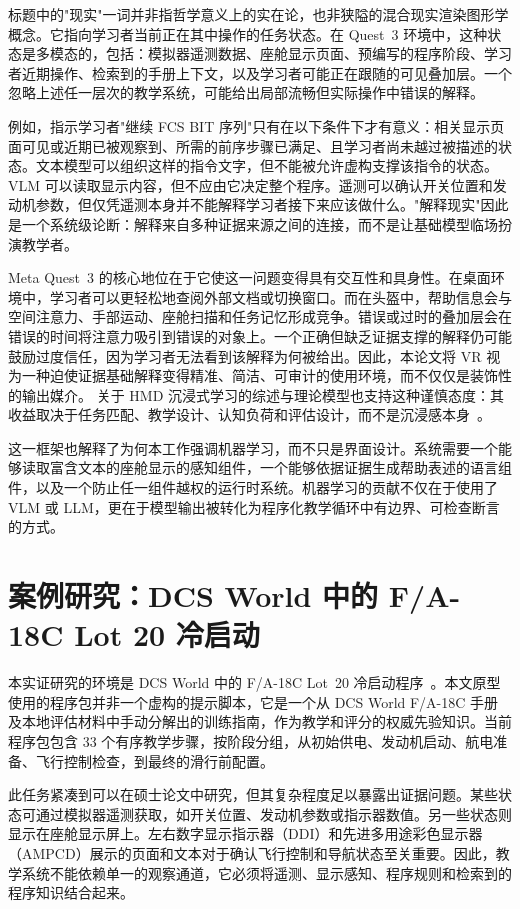 标题中的"现实"一词并非指哲学意义上的实在论，也非狭隘的混合现实渲染图形学概念。它指向学习者当前正在其中操作的任务状态。在 Quest~3 环境中，这种状态是多模态的，包括：模拟器遥测数据、座舱显示页面、预编写的程序阶段、学习者近期操作、检索到的手册上下文，以及学习者可能正在跟随的可见叠加层。一个忽略上述任一层次的教学系统，可能给出局部流畅但实际操作中错误的解释。

例如，指示学习者"继续 FCS BIT 序列"只有在以下条件下才有意义：相关显示页面可见或近期已被观察到、所需的前序步骤已满足、且学习者尚未越过被描述的状态。文本模型可以组织这样的指令文字，但不能被允许虚构支撑该指令的状态。VLM 可以读取显示内容，但不应由它决定整个程序。遥测可以确认开关位置和发动机参数，但仅凭遥测本身并不能解释学习者接下来应该做什么。"解释现实"因此是一个系统级论断：解释来自多种证据来源之间的连接，而不是让基础模型临场扮演教学者。

Meta Quest~3 的核心地位在于它使这一问题变得具有交互性和具身性。在桌面环境中，学习者可以更轻松地查阅外部文档或切换窗口。而在头盔中，帮助信息会与空间注意力、手部运动、座舱扫描和任务记忆形成竞争。错误或过时的叠加层会在错误的时间将注意力吸引到错误的对象上。一个正确但缺乏证据支撑的解释仍可能鼓励过度信任，因为学习者无法看到该解释为何被给出。因此，本论文将 VR 视为一种迫使证据基础解释变得精准、简洁、可审计的使用环境，而不仅仅是装饰性的输出媒介。
关于 HMD 沉浸式学习的综述与理论模型也支持这种谨慎态度：其收益取决于任务匹配、教学设计、认知负荷和评估设计，而不是沉浸感本身~\citep{jensen2018vrhmd,radianti2020ivr,makransky2021camil}。

这一框架也解释了为何本工作强调机器学习，而不只是界面设计。系统需要一个能够读取富含文本的座舱显示的感知组件，一个能够依据证据生成帮助表述的语言组件，以及一个防止任一组件越权的运行时系统。机器学习的贡献不仅在于使用了 VLM 或 LLM，更在于模型输出被转化为程序化教学循环中有边界、可检查断言的方式。

\section{案例研究：DCS World 中的 F/A-18C Lot 20 冷启动}\label{sec:intro-case}

本实证研究的环境是 DCS World 中的 F/A-18C Lot~20 冷启动程序~\citep{dcsworld,eagledynamics2023hornetguide}。本文原型使用的程序包并非一个虚构的提示脚本，它是一个从 DCS World F/A-18C 手册及本地评估材料中手动分解出的训练指南，作为教学和评分的权威先验知识。当前程序包包含 33 个有序教学步骤，按阶段分组，从初始供电、发动机启动、航电准备、飞行控制检查，到最终的滑行前配置。

此任务紧凑到可以在硕士论文中研究，但其复杂程度足以暴露出证据问题。某些状态可通过模拟器遥测获取，如开关位置、发动机参数或指示器数值。另一些状态则显示在座舱显示屏上。左右数字显示指示器（DDI）和先进多用途彩色显示器（AMPCD）展示的页面和文本对于确认飞行控制和导航状态至关重要。因此，教学系统不能依赖单一的观察通道，它必须将遥测、显示感知、程序规则和检索到的程序知识结合起来。

